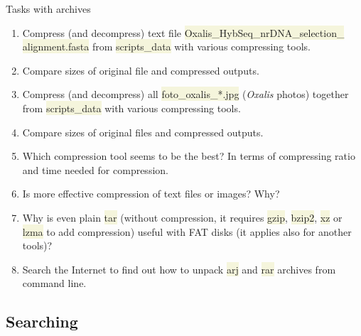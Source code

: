 \documentclass[compress, xelatex, 11pt, xcolor=svgnames, aspectratio=169, url={hyphens, lowtilde}]{beamer}
\renewcommand{\texttt}[1]{\colorbox{Beige}{{\ttfamily #1}}}
\begin{document}
\begin{frame}{Tasks with archives}
	\begin{enumerate}
		\item Compress (and decompress) text file \texttt{Oxalis\_HybSeq\_nrDNA\_selection\_} \texttt{alignment.fasta} from \texttt{scripts\_data} with various compressing tools.
		\item Compare sizes of original file and compressed outputs.
		\item Compress (and decompress) all \texttt{foto\_oxalis\_*.jpg} (\textit{Oxalis} photos) together from \texttt{scripts\_data} with various compressing tools.
		\item Compare sizes of original files and compressed outputs.
		\item Which compression tool seems to be the best? In terms of compressing ratio and time needed for compression.
		\item Is more effective compression of text files or images? Why?
		\item Why is even plain \texttt{tar} (without compression, it requires \texttt{gzip}, \texttt{bzip2}, \texttt{xz} or \texttt{lzma} to add compression) useful with FAT disks (it applies also for another tools)?
		\item Search the Internet to find out how to unpack \texttt{arj} and \texttt{rar} archives from command line.
	\end{enumerate}
\end{frame}

\subsection{Searching}
\end{document}
